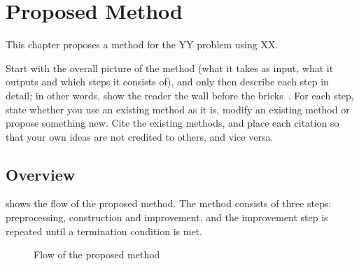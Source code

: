 \chapter{Proposed Method}
\label{chap:method}

This chapter proposes a method for the YY problem using XX.
\begin{writingnote}
Start with the overall picture of the method (what it takes as input, what it outputs and which steps it consists of),
and only then describe each step in detail; in other words, show the reader the wall before the bricks~\cite{glasmandeal2010science}.
For each step, state whether you use an existing method as it is, modify an existing method or propose something new.
Cite the existing methods, and place each citation so that your own ideas are not credited to others, and vice versa.
\end{writingnote}

\section{Overview}
\label{sec:overview}

 shows the flow of the proposed method.
The method consists of three steps: preprocessing, construction and improvement,
and the improvement step is repeated until a termination condition is met.

\begin{figure}[tbp]
  \centering
  \caption{Flow of the proposed method}
  \label{fig:flow}
\end{figure}

